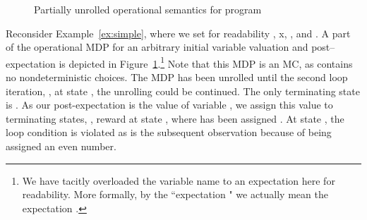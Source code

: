 \begin{figure}[t]
\begin{center}
{
 }	
\end{center}
\caption{Partially unrolled operational semantics for program }	
\label{fig:better_operational_example}
\end{figure}
\begin{example}


Reconsider Example~\ref{ex:simple}, where we set for readability , x, , and . 
A part of the operational MDP  for an arbitrary initial variable valuation  and post--expectation  is depicted in Figure~\ref{fig:better_operational_example}.\footnote{We have tacitly overloaded the variable name  to an expectation here for readability. More formally, by the ``expectation " we actually mean the expectation .}
Note that this MDP is an MC, as  contains no nondeterministic choices. The MDP has been unrolled until the second loop iteration, \ie, at state , the unrolling could be continued. The only terminating state is . 
As our post-expectation is the value of variable , we assign this value to terminating states, \ie, reward  at state , where  has been assigned . At state , the loop condition is violated as is the subsequent observation because of  being assigned an even number.
\hfill
\end{example}

